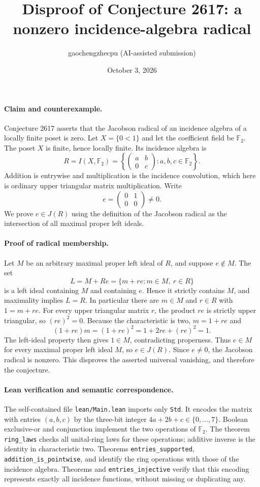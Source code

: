 \documentclass[10pt]{article}
\title{Disproof of Conjecture 2617: a nonzero incidence-algebra radical}
\author{gaochengzhecpu (AI-assisted submission)}
\date{October 3, 2026}
\makeatletter
\renewcommand{\maketitle}{\begin{center}
{\Large\bfseries\@title\par}\vspace{0.6em}
{\small\@author\par\@date}
\end{center}\vspace{0.5em}}
\makeatother
\begin{document}
\maketitle

\paragraph{Claim and counterexample.}
Conjecture 2617 asserts that the Jacobson radical of an incidence algebra
of a locally finite poset is zero. Let $X=\{0<1\}$ and let the coefficient
field be $\mathbb F_2$. The poset $X$ is finite, hence locally finite.
Its incidence algebra is
\[
 R=I(X,\mathbb F_2)
 =\left\{\begin{pmatrix}a&b\\0&c\end{pmatrix}:a,b,c\in\mathbb F_2\right\}.
\]
Addition is entrywise and multiplication is the incidence convolution,
which here is ordinary upper triangular matrix multiplication.
Write
\[
 e=\begin{pmatrix}0&1\\0&0\end{pmatrix}\ne0.
\]
We prove $e\in J(R)$ using the definition of the Jacobson radical as
the intersection of all maximal proper left ideals.

\paragraph{Proof of radical membership.}
Let $M$ be an arbitrary maximal proper left ideal of $R$, and suppose
$e\notin M$. The set
\[
 L=M+Re=\{m+re:m\in M,\ r\in R\}
\]
is a left ideal containing $M$ and containing $e$. Hence it strictly
contains $M$, and maximality implies $L=R$. In particular there are
$m\in M$ and $r\in R$ with $1=m+re$.
For every upper triangular matrix $r$, the product $re$ is strictly
upper triangular, so $(re)^2=0$. Because the characteristic is two,
$m=1+re$ and
\[
 (1+re)m=(1+re)^2=1+2re+(re)^2=1.
\]
The left-ideal property then gives $1\in M$, contradicting properness.
Thus $e\in M$ for every maximal proper left ideal $M$, so $e\in J(R)$.
Since $e\ne0$, the Jacobson radical is nonzero. This disproves the
asserted universal vanishing, and therefore the conjecture.

\paragraph{Lean verification and semantic correspondence.}
The self-contained file \texttt{lean/Main.lean} imports only \texttt{Std}.
It encodes the matrix with entries $(a,b,c)$ by the three-bit integer
$4a+2b+c\in\{0,\ldots,7\}$. Boolean exclusive-or and conjunction
implement the two operations of $\mathbb F_2$.
The theorem \texttt{ring\_laws} checks all unital-ring laws for these
operations; additive inverse is the identity in characteristic two.
Theorems \texttt{entries\_supported},
\texttt{addition\_is\_pointwise}, and
 identify the ring operations
with those of the incidence algebra. Theorems
 and
\texttt{entries\_injective} verify that this encoding represents
exactly all incidence functions, without missing or duplicating any.
\end{document}
